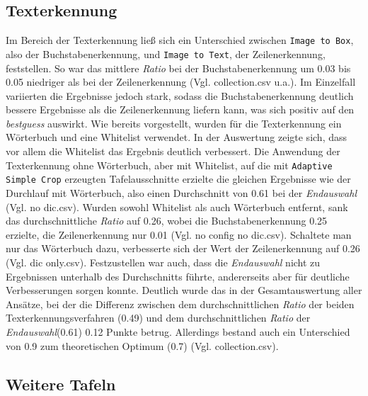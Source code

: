 \subsection{Texterkennung}
Im Bereich der Texterkennung ließ sich ein Unterschied zwischen \verb|Image to Box|, also der Buchstabenerkennung, und \verb|Image to Text|, der Zeilenerkennung, feststellen. So war das mittlere \textit{Ratio} bei der Buchstabenerkennung um 0.03 bis 0.05 niedriger als bei der Zeilenerkennung (Vgl. collection.csv u.a.). Im Einzelfall variierten die Ergebnisse jedoch stark, sodass die Buchstabenerkennung deutlich bessere Ergebnisse als die Zeilenerkennung liefern kann, was sich positiv auf den \textit{bestguess} auswirkt.
Wie bereits vorgestellt, wurden für die Texterkennung ein Wörterbuch und eine Whitelist verwendet. In der Auswertung zeigte sich, dass vor allem die Whitelist das Ergebnis deutlich verbessert. Die Anwendung der Texterkennung ohne Wörterbuch, aber mit Whitelist, auf die mit \verb|Adaptive Simple Crop| erzeugten Tafelausschnitte erzielte die gleichen Ergebnisse wie der Durchlauf mit Wörterbuch, also einen Durchschnitt von 0.61 bei der \textit{Endauswahl} (Vgl. no dic.csv). Wurden sowohl Whitelist als auch Wörterbuch entfernt, sank das durchschnittliche \textit{Ratio} auf 0.26, wobei die Buchstabenerkennung 0.25 erzielte, die Zeilenerkennung nur 0.01 (Vgl. no config no dic.csv). Schaltete man nur das Wörterbuch dazu, verbesserte sich der Wert der Zeilenerkennung auf 0.26 (Vgl. dic only.csv).
Festzustellen war auch, dass die \textit{Endauswahl} nicht zu Ergebnissen unterhalb des Durchschnitts führte, andererseits aber für deutliche Verbesserungen sorgen konnte. Deutlich wurde das in der Gesamtauswertung aller Ansätze, bei der die Differenz zwischen dem durchschnittlichen \textit{Ratio} der beiden Texterkennungsverfahren (0.49) und dem durchschnittlichen \textit{Ratio} der \textit{Endauswahl}(0.61) 0.12 Punkte betrug. Allerdings bestand auch ein Unterschied von 0.9 zum theoretischen Optimum (0.7) (Vgl. collection.csv).


\subsection{Weitere Tafeln}


